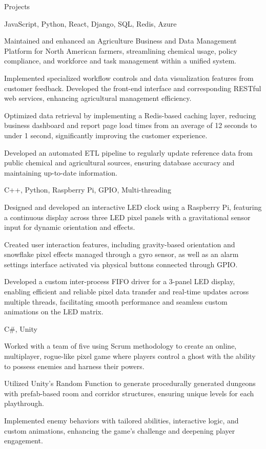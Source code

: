 \documentclass[10pt]{article}
\begin{document}
\begin{customsection}{Projects}

    {JavaScript, Python, React, Django, SQL, Redis, Azure}
    {
        \item Maintained and enhanced an Agriculture Business and Data Management Platform for North American farmers, streamlining chemical usage, policy compliance, and workforce and task management within a unified system.
        \item Implemented specialized workflow controls and data visualization features from customer feedback. Developed the front-end interface and corresponding RESTful web services, enhancing agricultural management efficiency.
        \item Optimized data retrieval by implementing a Redis-based caching layer, reducing business dashboard and report page load times from an average of 12 seconds to under 1 second, significantly improving the customer experience.
        \item Developed an automated ETL pipeline to regularly update reference data from public chemical and agricultural sources, ensuring database accuracy and maintaining up-to-date information.
    }

    {C++, Python, Raspberry Pi, GPIO, Multi-threading}
    {
        \item Designed and developed an interactive LED clock using a Raspberry Pi, featuring a continuous display across three LED pixel panels with a gravitational sensor input for dynamic orientation and effects.
        \item Created user interaction features, including gravity-based orientation and snowflake pixel effects managed through a gyro sensor, as well as an alarm settings interface activated via physical buttons connected through GPIO.
        \item Developed a custom inter-process FIFO driver for a 3-panel LED display, enabling efficient and reliable pixel data transfer and real-time updates across multiple threads, facilitating smooth performance and seamless custom animations on the LED matrix.
    }

    {C\#, Unity}
    {
        \item Worked with a team of five using Scrum methodology to create an online, multiplayer, rogue-like pixel game where players control a ghost with the ability to possess enemies and harness their powers.
        \item Utilized Unity’s Random Function to generate procedurally generated dungeons with prefab-based room and corridor structures, ensuring unique levels for each playthrough.
        \item Implemented enemy behaviors with tailored abilities, interactive logic, and custom animations, enhancing the game's challenge and deepening player engagement.
    }

\end{customsection}
\end{document}
